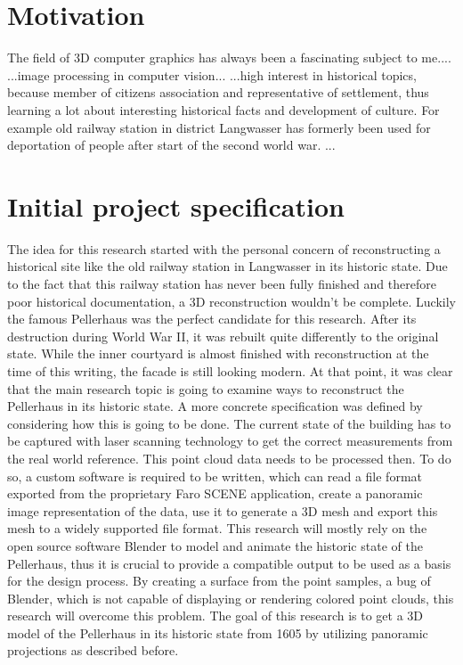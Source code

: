 \section{Motivation}

The field of 3D computer graphics has always been a fascinating subject to me....
...image processing in computer vision...
...high interest in historical topics, because member of citizens association and representative of settlement, thus learning a lot about interesting historical facts and development of culture. For example old railway station in district Langwasser has formerly been used for deportation of people after start of the second world war.
...

\section{Initial project specification}

The idea for this research started with the personal concern of reconstructing a historical site like the old railway station in Langwasser in its historic state. Due to the fact that this railway station has never been fully finished and therefore poor historical documentation, a 3D reconstruction wouldn't be complete. Luckily the famous Pellerhaus was the perfect candidate for this research. After its destruction during World War II, it was rebuilt quite differently to the original state. While the inner courtyard is almost finished with reconstruction at the time of this writing, the facade is still looking modern. At that point, it was clear that the main research topic is going to examine ways to reconstruct the Pellerhaus in its historic state.
A more concrete specification was defined by considering how this is going to be done. The current state of the building has to be captured with laser scanning technology to get the correct measurements from the real world reference. This point cloud data needs to be processed then. To do so, a custom software is required to be written, which can read a file format exported from the proprietary Faro SCENE application, create a panoramic image representation of the data, use it to generate a 3D mesh and export this mesh to a widely supported file format. This research will mostly rely on the open source software Blender to model and animate the historic state of the Pellerhaus, thus it is crucial to provide a compatible output to be used as a basis for the design process. By creating a surface from the point samples, a bug of Blender, which is not capable of displaying or rendering colored point clouds\parencite[see][p10]{webBlenderArtistsPointCloudSupport}, this research will overcome this problem. The goal of this research is to get a 3D model of the Pellerhaus in its historic state from 1605 by utilizing panoramic projections as described before.


